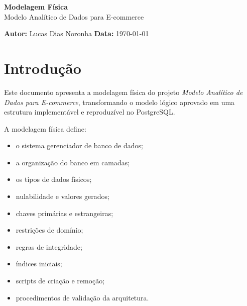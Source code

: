 \documentclass[12pt,a4paper]{article}
\newcommand{\projeto}{Modelo Analítico de Dados para E-commerce}
\newcommand{\autor}{Lucas Dias Noronha}
\newcommand{\dataDocumento}{\today}
\begin{document}
	
	\thispagestyle{empty}
	
	\vspace*{\fill}
	
	\begin{center}
		{\Huge
			\textcolor{AzulCorporativo}{
				\textbf{Modelagem Física}
		}}\\[0.5cm]
		
		{\Large
			\textcolor{AzulPetroleo}{
				\projeto
		}}\\[0.8cm]
	\end{center}
	
	\vspace*{\fill}
	
	\noindent
	\textbf{\textcolor{AzulCorporativo}{Autor:}} \autor
	\hfill
	\textbf{\textcolor{AzulCorporativo}{Data:}} \dataDocumento
	
	\newpage
	
	\setcounter{tocdepth}{2}
	\tableofcontents
	
	\newpage
	
	\section{Introdução}
	
	Este documento apresenta a modelagem física do projeto
	\textit{\projeto}, transformando o modelo lógico aprovado em uma
	estrutura implementável e reproduzível no PostgreSQL.
	
	A modelagem física define:
	
	\begin{itemize}[leftmargin=1.2cm]
		\item o sistema gerenciador de banco de dados;
		\item a organização do banco em camadas;
		\item os tipos de dados físicos;
		\item nulabilidade e valores gerados;
		\item chaves primárias e estrangeiras;
		\item restrições de domínio;
		\item regras de integridade;
		\item índices iniciais;
		\item scripts de criação e remoção;
		\item procedimentos de validação da arquitetura.
	\end{itemize}
	
\end{document}
